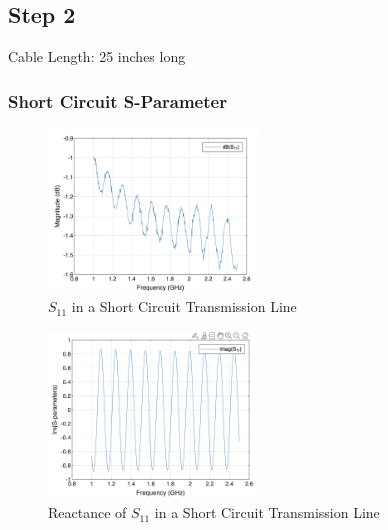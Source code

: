 \documentclass{article} %
\begin{document}
\subsection*{Step 2}

Cable Length: 25 inches long

\subsubsection*{Short Circuit S-Parameter}
\begin{figure}[H]
    \centering
    \includegraphics[width=0.5\textwidth]{./image/figure4.png}
    \caption{$S_{11}$ in a Short Circuit Transmission Line}
\end{figure}
\begin{figure}[H]
    \centering
    \includegraphics[width=0.5\textwidth]{./image/figure5.png}
    \caption{Reactance of $S_{11}$ in a Short Circuit Transmission Line}
\end{figure}
\end{document}
